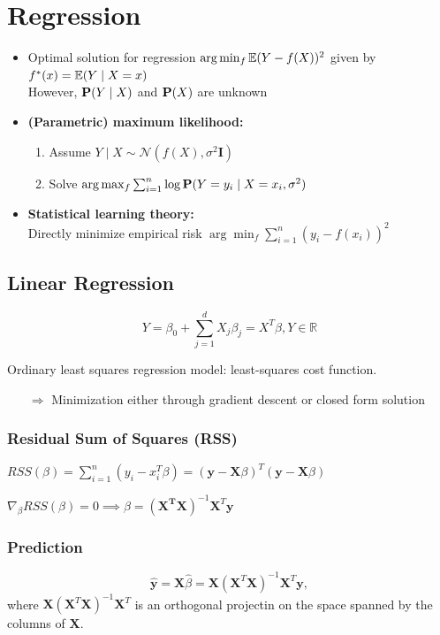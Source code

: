 \section{Regression}
\begin{itemize}
	\item Optimal solution for regression $\arg\min_f\E(Y - f(X))^2$ given by $f^*(x) = \E(Y \mid X=x)$ \\
		However, $\P(Y\mid X)$ and $\P(X)$ are unknown
	\item \textbf{(Parametric) maximum likelihood: }
	\begin{enumerate}
		\item Assume $Y\mid X \sim \mathcal N(f(X), \sigma^2\mathbf I)$
		\item Solve $\arg\max_f\sum_{i = 1}^n \log\P(Y = y_i\mid X=x_i, \sigma^2)$
	\end{enumerate}
	\item \textbf{Statistical learning theory: } \\ Directly minimize empirical risk $\arg\min_f\sum_{i = 1}^n (y_i - f(x_i))^2$
\end{itemize}
\subsection{Linear Regression}
$$
	Y = \beta_0 + \sum_{j = 1}^d X_j\beta_j = X^T\beta, Y\in \mathbb R
$$


Ordinary least squares regression model: least-squares cost function. 
\begin{itemize}
	\item[$\Rightarrow$] Minimization either through gradient descent or closed form solution 
\end{itemize}
\subsubsection{Residual Sum of Squares (RSS)}

$
	RSS(\beta) = \sum_{i = 1}^n (y_i - x_i^T\beta) = (\mathbf y - \mathbf X\beta)^T(\mathbf y - \mathbf X\beta)
$

$\nabla_\beta RSS(\beta) = 0 \implies \hat\beta = (\mathbf{X^TX})^{-1}\mathbf X^T\mathbf y$


\subsubsection{Prediction}
$$
	\hat{\mathbf y} = \mathbf X \hat\beta = \mathbf X(\mathbf X^T\mathbf X)^{-1}\mathbf X^T \mathbf y, 
$$
where $\mathbf X(\mathbf X^T\mathbf X)^{-1}\mathbf X^T$ is an orthogonal projectin on the space spanned by the columns of $\mathbf X$.

